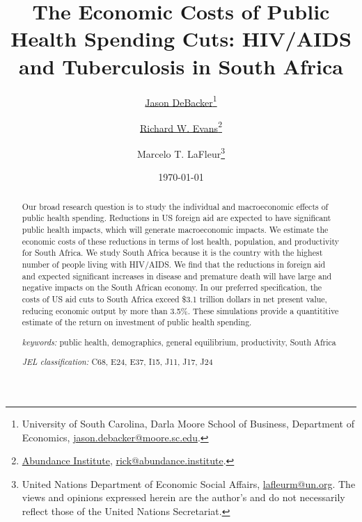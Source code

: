 \documentclass[letterpaper,12pt]{article}
\theoremstyle{definition}
\begin{document}
\begin{titlepage}
\title{The Economic Costs of Public Health Spending Cuts: HIV/AIDS and Tuberculosis in South Africa}
\date{\today}
\author{\href{http://jasondebacker.com/}{Jason DeBacker}\thanks{University of South Carolina, Darla Moore School of Business, Department of Economics, \href{mailto:jason.debacker@moore.sc.edu}{jason.debacker@moore.sc.edu}.}\and \href{https://sites.google.com/site/rickecon}{Richard W. Evans}\thanks{\href{https://abundance.institute/}{Abundance Institute}, \href{mailto:rick@abundance.institute}{rick@abundance.institute}.}\and {Marcelo T. LaFleur}\thanks{{United Nations Department of Economic Social Affairs}, \href{mailto:lafleurm@un.org}{lafleurm@un.org}. The views and opinions expressed herein are the author's and do not necessarily reflect those of the United Nations Secretariat.}}
\maketitle
\vspace{-2mm}
\begin{abstract}
\small{Our broad research question is to study the individual and macroeconomic effects of public health spending. Reductions in US foreign aid are expected to have significant public health impacts, which will generate macroeconomic impacts. We estimate the economic costs of these reductions in terms of lost health, population, and productivity for South Africa. We study South Africa because it is the country with the highest number of people living with HIV/AIDS. We find that the reductions in foreign aid and expected significant increases in disease and premature death will have large and negative impacts on the South African economy. In our preferred specification, the costs of US aid cuts to South Africa exceed \$3.1 trillion dollars in net present value, reducing economic output by more than 3.5\%. These simulations provide a quantititive estimate of the return on investment of public health spending.}

\vspace{10mm}

\noindent\textit{keywords:}\: public health, demographics, general equilibrium, productivity, South Africa

\vspace{10mm}

\noindent\textit{JEL classification:} C68, E24, E37, I15, J11, J17, J24


\end{abstract}
\thispagestyle{empty}
\end{titlepage}
\end{document}
